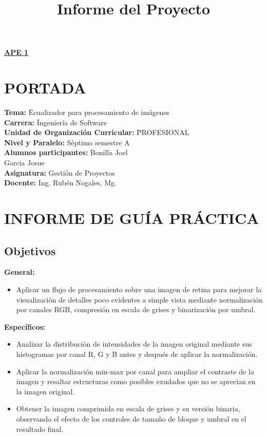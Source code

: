 \documentclass[11pt]{article}
\title{Informe del Proyecto}
\begin{document}
\renewcommand{\thesection}{\Roman{section}}
\begin{center}
    \textbf{\underline{\normalsize APE 1}}
\end{center}

\section{PORTADA}

\begin{tabbing}
    \textbf{Tema:}\hspace{1cm} \= Ecualizador para procesamiento de imágenes \\[0.25em]
    \textbf{Carrera:}\hspace{1cm} \= Ingeniería de Software \\[0.25em]
    \textbf{Unidad de Organización Curricular:} \hspace{1cm} \= PROFESIONAL \\[0.25em]
    \textbf{Nivel y Paralelo:} \> Séptimo semestre A \\[0.25em]
    \textbf{Alumnos participantes:} \> Bonilla Joel \\
    \> Garcia Josue \\[0.25em]
    \textbf{Asignatura:} \> Gestión de Proyectos \\[0.25em]
    \textbf{Docente:} \> Ing. Rubén Nogales, Mg.
\end{tabbing}

\section{INFORME DE GUÍA PRÁCTICA}
\renewcommand{\thesection}{\arabic{section}}

\subsection{Objetivos}
\textbf{General:}
\begin{itemize}
    \item Aplicar un flujo de procesamiento sobre una imagen de retina para mejorar la visualización de detalles poco evidentes a simple vista mediante normalización por canales RGB, compresión en escala de grises y binarización por umbral.
\end{itemize}

\textbf{Específicos:}
\begin{itemize}
    \item Analizar la distribución de intensidades de la imagen original mediante sus histogramas por canal R, G y B antes y después de aplicar la normalización.
    \item Aplicar la normalización min-max por canal para ampliar el contraste de la imagen y resaltar estructuras como posibles exudados que no se aprecian en la imagen original.
    \item Obtener la imagen comprimida en escala de grises y su versión binaria, observando el efecto de los controles de tamaño de bloque y umbral en el resultado final.
\end{itemize}
\end{document}
